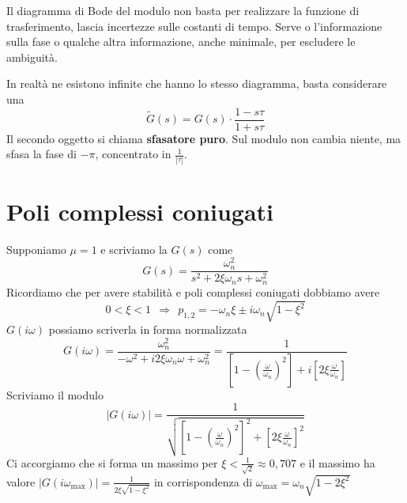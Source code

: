 \documentclass[10pt,a4paper]{book}
\begin{document}
Il diagramma di Bode del modulo non basta per realizzare la funzione di trasferimento, lascia incertezze sulle costanti di tempo. Serve o l'informazione sulla fase o qualche altra informazione, anche minimale, per escludere le ambiguità.

In realtà ne esistono infinite che hanno lo stesso diagramma, basta considerare una
\begin{equation*}
\tilde{G}( s) =G( s) \cdotp \frac{1-s\tau }{1+s\tau }
\end{equation*}
Il secondo oggetto si chiama \textbf{sfasatore puro}. Sul modulo non cambia niente, ma sfasa la fase di $-\pi $, concentrato in $\frac{1}{| \tau | }$.
\section{Poli complessi coniugati}

Supponiamo $\mu =1$ e scriviamo la $G( s)$ come
\begin{equation*}
G( s) =\frac{\omega ^{2}_{n}}{s^{2} +2\xi \omega _{n} s+\omega ^{2}_{n}}
\end{equation*}
Ricordiamo che per avere stabilità e poli complessi coniugati dobbiamo avere
\begin{equation*}
0< \xi < 1\ \ \Rightarrow \ \ p_{1,2} =-\omega _{n} \xi \pm i\omega _{n}\sqrt{1-\xi ^{2}}
\end{equation*}
$G( i\omega )$ possiamo scriverla in forma normalizzata
\begin{equation*}
G( i\omega ) =\frac{\omega ^{2}_{n}}{-\omega ^{2} +i2\xi \omega _{n} \omega +\omega ^{2}_{n}} =\frac{1}{\left[ 1-\left(\frac{\omega }{\omega _{n}}\right)^{2}\right] +i\left[ 2\xi \frac{\omega }{\omega _{n}}\right]}
\end{equation*}
Scriviamo il modulo
\begin{equation*}
| G( i\omega )| =\frac{1}{\sqrt{\left[ 1-\left(\frac{\omega }{\omega _{n}}\right)^{2}\right]^{2} +\left[ 2\xi \frac{\omega }{\omega _{n}}\right]^{2}}}
\end{equation*}
Ci accorgiamo che si forma un massimo per $\xi < \frac{1}{\sqrt{2}} \approx 0,707$ e il massimo ha valore $| G( i\omega _{\text{max}})| =\frac{1}{2\xi \sqrt{1-\xi ^{2}}}$ in corrispondenza di $\omega _{\text{max}} =\omega _{n}\sqrt{1-2\xi ^{2}}$
\end{document}
